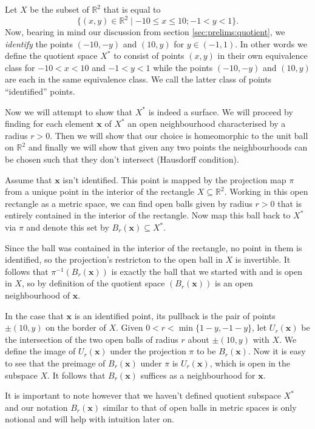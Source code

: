 \begin{exmp}
  Let $X$ be the subset of $\mathbb{R}^2$ that is equal to
  \[
    \{ (x,y) \in \mathbb{R}^2 \mid -10 \leq x \leq 10 ; -1 < y < 1 \}.
  \]
  Now, bearing in mind our discussion from section
  \ref{sec:prelims:quotient}, we \emph{identify} the points $(-10,-y)$
  and $(10,y)$ for $y \in (-1,1)$. In other words we define the
  quotient space $X^*$ to consist of points $(x,y)$ in their own
  equivalence class for $-10 < x < 10$ and $-1 < y < 1$ while the
  points $(-10,-y)$ and $(10,y)$ are each in the same equivalence
  class. We call the latter class of points ``identified'' points.
  
  Now we will attempt to show that $X^*$ is indeed a surface. We will
  proceed by finding for each element $\mathbf{x}$ of $X^*$ an open
  neighbourhood characterised by a radius $r > 0$. Then we will show
  that our choice is homeomorphic to the unit ball on $\mathbb{R}^2$
  and finally we will show that given any two points the
  neighbourhoods can be chosen such that they don't intersect
  (Hausdorff condition).

  Assume that $\mathbf{x}$ isn't identified. This point is mapped by
  the projection map $\pi$ from a unique point in the interior of the
  rectangle $X \subseteq \mathbb{R}^2$. Working in this open rectangle
  as a metric space, we can find open balls given by radius $r >0$
  that is entirely contained in the interior of the rectangle. Now
  map this ball back to $X^*$ via $\pi$ and denote this set by
  $B_r(\mathbf{x}) \subseteq X^*$.
  
  Since the ball was contained in the interior of the rectangle, no
  point in them is identified, so the projection's restricton to the
  open ball in $X$ is invertible. It follows that $\pi^{-1}
  (B_r(\mathbf{x}))$ is exactly the ball that we started with and is
  open in $X$, so by definition of the quotient space
  $(B_r(\mathbf{x}))$ is an open neighbourhood of $\mathbf{x}$.

  In the case that $\mathbf{x}$ is an identified point, its pullback
  is the pair of points $\pm(10, y)$ on the border of $X$. Given $0 <
  r < \operatorname{min} \{ 1-y, -1-y \}$, let $U_r(\mathbf{x})$ be
  the intersection of the two open balls of radius $r$ about $\pm(10,
  y)$ with $X$. We define the image of $U_r(\mathbf{x})$ under the
  projection $\pi$ to be $B_r(\mathbf{x})$. Now it is easy to see that
  the preimage of $B_r(\mathbf{x})$ under $\pi$ is $U_r(\mathbf{x})$,
  which is open in the subspace $X$. It follows that $B_r(\mathbf{x})$
  suffices as a neighbourhood for $\mathbf{x}$.

  It is important to note however that we haven't defined quotient
  subspace $X^*$ and our notation $B_r(\mathbf{x})$ similar to that of
  open balls in metric spaces is only notional and will help with
  intuition later on.
\end{exmp}


